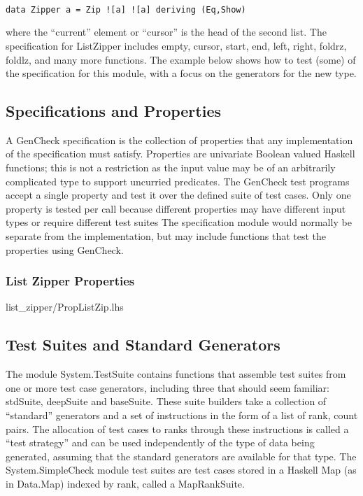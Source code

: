 \begin{verbatim}

data Zipper a = Zip ![a] ![a] deriving (Eq,Show)

\end{verbatim}

where the ``current'' element or ``cursor'' is the head of the second list.
The specification for ListZipper includes empty, cursor, start, end, left, right, foldrz, foldlz, 
and many more functions.  The example below shows how to test (some)
of the specification for this module, with a focus on the generators for the new type.

\subsection{Specifications and Properties}
A GenCheck specification is the collection of properties
that any implementation of the specification must satisfy.
Properties are univariate Boolean valued Haskell functions;
this is not a restriction as the input value may be of an arbitrarily complicated type 
to support uncurried predicates. The GenCheck test programs accept 
a single property and test it over the defined suite of test cases.
Only one property is tested per call because different properties 
may have different input types or require different test suites
The specification module would normally be separate from the implementation,
but may include functions that test the properties using GenCheck.

\subsubsection{List Zipper Properties}

 {list_zipper/PropListZip.lhs}

\subsection{Test Suites and Standard Generators}
The module System.TestSuite contains functions that assemble test suites 
from one or more test case generators, including three that should seem familiar: 
stdSuite, deepSuite and baseSuite.  These suite builders take a collection of 
``standard'' generators and a set of instructions in the form of  a list of rank, count pairs.  
The allocation of test cases to ranks through these instructions is called a ``test strategy'' 
and can be used independently of the type of data being generated, 
assuming that the standard generators are available for that type.
The System.SimpleCheck module test suites are test cases stored in 
a Haskell Map (as in Data.Map) indexed by rank, called a MapRankSuite.

